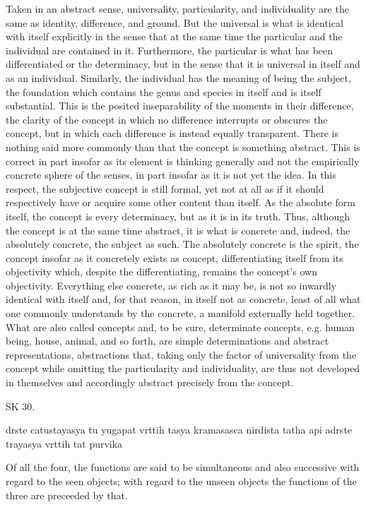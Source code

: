 Taken in an abstract sense, universality, particularity, and individuality
are the same as identity, difference, and ground.
But the universal is what is identical with itself explicitly
in the sense that at the same time the particular and the individual
are contained in it.
Furthermore, the particular is what has been differentiated or the determinacy,
but in the sense that it is universal in itself and as an individual.
Similarly, the individual has the meaning of being the subject,
the foundation which contains the genus and species in itself
and is itself substantial.
This is the posited inseparability of the moments
in their difference, the clarity of the concept in which
no difference interrupts or obscures the concept,
but in which each difference is instead equally transparent.
There is nothing said more commonly than that the concept is something abstract.
This is correct in part insofar as its element is thinking generally and
not the empirically concrete sphere of the senses,
in part insofar as it is not yet the idea.
In this respect, the subjective concept is still formal,
yet not at all as if it should respectively have or acquire
some other content than itself.
As the absolute form itself, the concept is every determinacy,
but as it is in its truth.
Thus, although the concept is at the same time abstract,
it is what is concrete and, indeed, the absolutely concrete,
the subject as such.
The absolutely concrete is the spirit,
the concept insofar as it concretely exists as concept,
differentiating itself from its objectivity which,
despite the differentiating, remains the concept's own objectivity.
Everything else concrete, as rich as it may be,
is not so inwardly identical with itself and, for that reason,
in itself not as concrete, least of all what one commonly understands
by the concrete, a manifold externally held together.
What are also called concepts and, to be sure, determinate concepts,
e.g. human being, house, animal, and so forth, are
simple determinations and abstract representations,
abstractions that, taking only the factor of universality
from the concept while omitting the particularity and individuality,
are thus not developed in themselves and
accordingly abstract precisely from the concept.

SK 30.

drste catustayasya tu yugapat vrttih tasya kramasasca nirdista
tatha api adrste trayasya vrttih tat purvika

Of all the four, the functions are said to be simultaneous and also successive
with regard to the seen objects;
with regard to the unseen objects
the functions of the three are preceeded by that.


